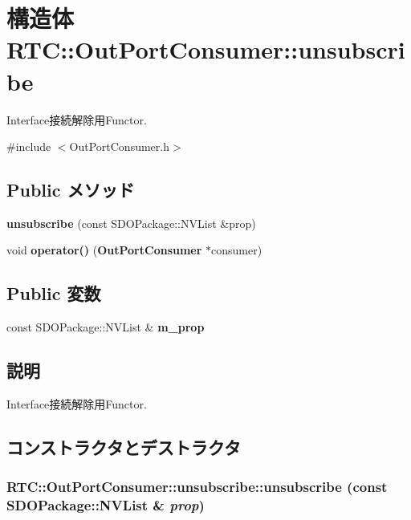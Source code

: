 \section{構造体 RTC::OutPortConsumer::unsubscribe}
\label{structRTC_1_1OutPortConsumer_1_1unsubscribe}


Interface接続解除用Functor.  




{\ttfamily \#include $<$OutPortConsumer.h$>$}

\subsection*{Public メソッド}
\begin{DoxyCompactItemize}
\item 
{\bf unsubscribe} (const SDOPackage::NVList \&prop)
\item 
void {\bf operator()} ({\bf OutPortConsumer} $\ast$consumer)
\end{DoxyCompactItemize}
\subsection*{Public 変数}
\begin{DoxyCompactItemize}
\item 
const SDOPackage::NVList \& {\bf m\_\-prop}
\end{DoxyCompactItemize}


\subsection{説明}
Interface接続解除用Functor. 

\subsection{コンストラクタとデストラクタ}
\subsubsection[{unsubscribe}]{\setlength{\rightskip}{0pt plus 5cm}RTC::OutPortConsumer::unsubscribe::unsubscribe (const SDOPackage::NVList \& {\em prop})\hspace{0.3cm}{\ttfamily  [inline]}}\label{structRTC_1_1OutPortConsumer_1_1unsubscribe_a25c120067765e6861ef00ea762916e1f}


